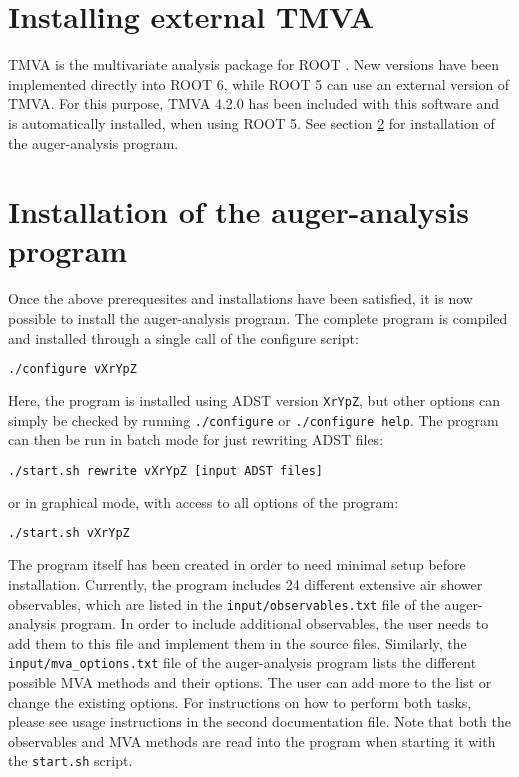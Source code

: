 \documentclass[12pt,a4paper]{report}
\begin{document}
\section{Installing external TMVA}
TMVA is the multivariate analysis package for ROOT \cite{tmva}. New versions have been implemented directly into ROOT 6, while ROOT 5 can use an external version of TMVA. For this purpose, TMVA 4.2.0 has been included with this software and is automatically installed, when using ROOT 5. See section \ref{sec:install} for installation of the auger-analysis program.

\section{Installation of the auger-analysis program} \label{sec:install}
Once the above prerequesites and installations have been satisfied, it is now possible to install the auger-analysis program. The complete program is compiled and installed through a single call of the configure script:
\begin{lstlisting}[language=bash]
  ./configure vXrYpZ
\end{lstlisting}
Here, the program is installed using ADST version \texttt{XrYpZ}, but other options can simply be checked by running \texttt{./configure} or \texttt{./configure help}. The program can then be run in batch mode for just rewriting ADST files:
\begin{lstlisting}[language=bash]
  ./start.sh rewrite vXrYpZ [input ADST files]
\end{lstlisting}
or in graphical mode, with access to all options of the program:
\begin{lstlisting}[language=bash]
  ./start.sh vXrYpZ
\end{lstlisting}

{\noindent}The program itself has been created in order to need minimal setup before installation. Currently, the program includes 24 different extensive air shower observables, which are listed in the \texttt{input/observables.txt} file of the auger-analysis program. In order to include additional observables, the user needs to add them to this file and implement them in the source files. Similarly, the \texttt{input/mva\_options.txt} file of the auger-analysis program lists the different possible MVA methods and their options. The user can add more to the list or change the existing options. For instructions on how to perform both tasks, please see usage instructions in the second documentation file. Note that both the observables and MVA methods are read into the program when starting it with the \texttt{start.sh} script.
\end{document}
